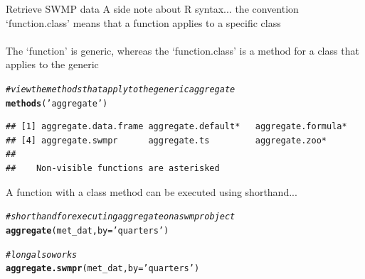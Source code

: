 \documentclass[xcolor=svgnames]{beamer}\usepackage[]{graphicx}\usepackage[]{color}
\makeatletter
\newcommand{\hlstr}[1]{\textcolor[rgb]{0.192,0.494,0.8}{#1}}%
\newcommand{\hlcom}[1]{\textcolor[rgb]{0.678,0.584,0.686}{\textit{#1}}}%
\newcommand{\hlstd}[1]{\textcolor[rgb]{0.345,0.345,0.345}{#1}}%
\newcommand{\hlkwc}[1]{\textcolor[rgb]{0.333,0.667,0.333}{#1}}%
\newcommand{\hlkwd}[1]{\textcolor[rgb]{0.737,0.353,0.396}{\textbf{#1}}}%
\newenvironment{kframe}{%
 \def\at@end@of@kframe{}%
 \ifinner\ifhmode%
  \def\at@end@of@kframe{\end{minipage}}%
  \begin{minipage}{\columnwidth}%
 \fi\fi%
 \def\FrameCommand##1{\hskip\@totalleftmargin \hskip-\fboxsep
 \colorbox{shadecolor}{##1}\hskip-\fboxsep
     \hskip-\linewidth \hskip-\@totalleftmargin \hskip\columnwidth}%
 \MakeFramed {\advance\hsize-\width
   \@totalleftmargin\z@ \linewidth\hsize
   \@setminipage}}%
 {\par\unskip\endMakeFramed%
 \at@end@of@kframe}
\newenvironment{knitrout}{}{} %
\makeatother
\begin{document}
\begin{frame}{Retrieve SWMP data}
A side note about R syntax... the convention `function.class' means that a function applies to a specific class \\~\\
The `function' is generic, whereas the `function.class' is a method for a class that applies to the generic
\begin{knitrout}\scriptsize
{}\color{fgcolor}\begin{kframe}
\begin{alltt}
\hlcom{# view the methods that apply to the generic aggregate}
\hlkwd{methods}\hlstd{(}\hlstr{'aggregate'}\hlstd{)}
\end{alltt}
\begin{verbatim}
## [1] aggregate.data.frame aggregate.default*   aggregate.formula*  
## [4] aggregate.swmpr      aggregate.ts         aggregate.zoo*      
## 
##    Non-visible functions are asterisked
\end{verbatim}
\end{kframe}
\end{knitrout}
A function with a class method can be executed using shorthand...
\begin{knitrout}\scriptsize
{}\color{fgcolor}\begin{kframe}
\begin{alltt}
\hlcom{# shorthand for executing aggregate on a swmpr object}
\hlkwd{aggregate}\hlstd{(met_dat,} \hlkwc{by} \hlstd{=} \hlstr{'quarters'}\hlstd{)}

\hlcom{# long also works}
\hlkwd{aggregate.swmpr}\hlstd{(met_dat,} \hlkwc{by} \hlstd{=} \hlstr{'quarters'}\hlstd{)}
\end{alltt}
\end{kframe}
\end{knitrout}
\end{frame}
\end{document}
